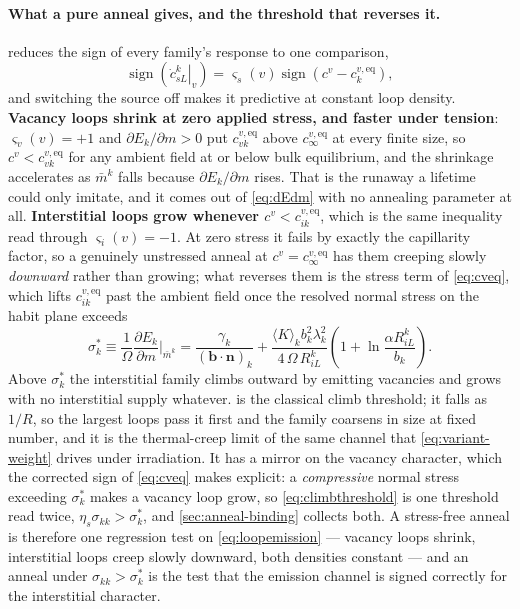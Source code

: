 \documentclass{article}
\newcommand{\bvec}{\bm b}
\newcommand{\nvec}{\bm n}
\begin{document}
\paragraph{What a pure anneal gives, and the threshold that reverses it.}
 reduces the sign of every family's response to one comparison,
\begin{equation}
  \operatorname{sign}\left(\left.\dot c^k_{sL}\right|_{v}\right)
  =\varsigma_s(v)\operatorname{sign}\!\left(c^{v}-c^{v,\mathrm{eq}}_{k}\right),
  \label{eq:annealsign}
\end{equation}
and switching the source off makes it predictive at constant loop density.
\textbf{Vacancy loops shrink at zero applied stress, and faster under tension}: $\varsigma_v(v)=+1$ and
$\partial E_k/\partial m>0$ put $c^{v,\mathrm{eq}}_{vk}$ above
$c^{v,\mathrm{eq}}_\infty$ at every finite size, so $c^v<c^{v,\mathrm{eq}}_{vk}$ for
any ambient field at or below bulk equilibrium, and the shrinkage accelerates as
$\bar m^k$ falls because $\partial E_k/\partial m$ rises. That is the runaway a
lifetime could only imitate, and it comes out of \cref{eq:dEdm} with no annealing
parameter at all. \textbf{Interstitial loops grow whenever
$c^v<c^{v,\mathrm{eq}}_{ik}$}, which is the same inequality read through
$\varsigma_i(v)=-1$. At zero stress it fails by exactly the capillarity factor,
so a genuinely unstressed anneal at $c^v=c^{v,\mathrm{eq}}_\infty$ has them
creeping slowly \emph{downward} rather than growing; what reverses them is the
stress term of \cref{eq:cveq}, which lifts $c^{v,\mathrm{eq}}_{ik}$ past the ambient
field once the resolved normal stress on the habit plane exceeds
\begin{equation}
  \sigma^{\ast}_{k}
  \equiv\frac{1}{\Omega}\frac{\partial E_k}{\partial m}\bigg|_{\bar m^k}
  =\frac{\gamma_k}{(\bvec\!\cdot\!\nvec)_k}
   +\frac{\langle K\rangle_kb_k^2\lambda_k^2}{4\,\Omega\,R^k_{iL}}
    \left(1+\ln\frac{\alpha R^k_{iL}}{b_k}\right).
  \label{eq:climbthreshold}
\end{equation}
Above $\sigma^\ast_k$ the interstitial family climbs outward by emitting
vacancies and grows with no interstitial supply whatever.
 is the classical climb threshold; it falls as $1/R$, so
the largest loops pass it first and the family coarsens in size at fixed number,
and it is the thermal-creep limit of the same channel that
\cref{eq:variant-weight} drives under irradiation. It has a mirror on the
vacancy character, which the corrected sign of \cref{eq:cveq} makes explicit: a
\emph{compressive} normal stress exceeding $\sigma^\ast_k$ makes a vacancy loop
grow, so \cref{eq:climbthreshold} is one threshold read twice,
$\eta_s\sigma_{kk}>\sigma^\ast_k$, and \cref{sec:anneal-binding} collects both. A stress-free anneal is
therefore one regression test on \cref{eq:loopemission} --- vacancy loops shrink,
interstitial loops creep slowly downward, both densities constant --- and an
anneal under $\sigma_{kk}>\sigma^\ast_k$ is the test that the emission channel is
signed correctly for the interstitial character.
\end{document}
